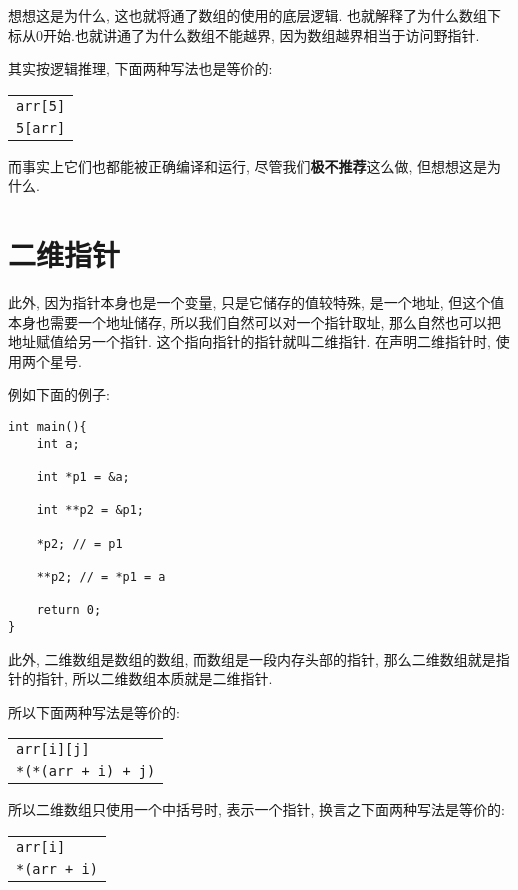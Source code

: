         想想这是为什么, 这也就将通了数组的使用的底层逻辑. 也就解释了为什么数组下标从0开始.也就讲通了为什么数组不能越界, 因为数组越界相当于访问野指针.

        其实按逻辑推理, 下面两种写法也是等价的:
        \begin{center}
        \begin{longtable}{l}
            \texttt{arr[5]}\\
            \texttt{5[arr]}
        \end{longtable}
        \end{center}

        而事实上它们也都能被正确编译和运行, 尽管我们\textbf{极不推荐}这么做, 但想想这是为什么.

    \section{二维指针}
        此外, 因为指针本身也是一个变量, 只是它储存的值较特殊, 是一个地址, 但这个值本身也需要一个地址储存, 所以我们自然可以对一个指针取址, 那么自然也可以把地址赋值给另一个指针. 这个指向指针的指针就叫二维指针. 在声明二维指针时, 使用两个星号.

        例如下面的例子:
\begin{lstlisting}
int main(){
    int a;

    int *p1 = &a;

    int **p2 = &p1;

    *p2; // = p1

    **p2; // = *p1 = a

    return 0;
}
\end{lstlisting}

        此外, 二维数组是数组的数组, 而数组是一段内存头部的指针, 那么二维数组就是指针的指针, 所以二维数组本质就是二维指针.

        所以下面两种写法是等价的:
        \begin{center}
        \begin{longtable}{l}
            \texttt{arr[i][j]} \\
            \texttt{*(*(arr + i) + j)}
        \end{longtable}
        \end{center}

        所以二维数组只使用一个中括号时, 表示一个指针, 换言之下面两种写法是等价的:
        \begin{center}
        \begin{longtable}{l}
            \texttt{arr[i]} \\
            \texttt{*(arr + i)}
        \end{longtable}
        \end{center}

